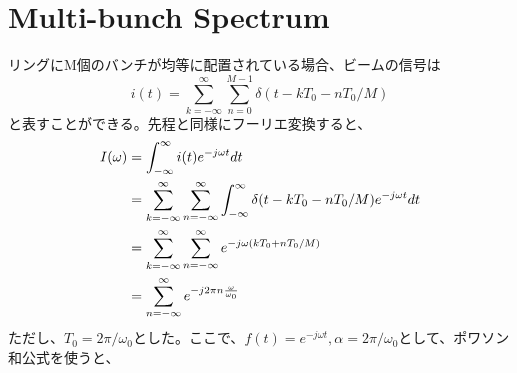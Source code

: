 \documentclass[]{jlreq}
\theoremstyle{definition}
\begin{document}
\section{Multi-bunch Spectrum}
リングにM個のバンチが均等に配置されている場合、ビームの信号は
%
\begin{equation}
  i(t) = \sum_{k=-\infty}^{\infty} \sum_{n=0}^{M-1}\delta (t - k T_0 -n T_0 / M)
\end{equation}
%
と表すことができる。先程と同様にフーリエ変換すると、
%
\begin{align}
  I(\omega) &= \int_{-\infty}^{\infty} i(t) e^{-j \omega t} dt\notag\\
    & = \sum_{k=-\infty}^{\infty} \sum_{n=-\infty}^{\infty} \int_{-\infty}^{\infty} \delta (t - k T_0 - n T_0/M) e^{-j \omega t} dt \notag \\ 
    &= \sum_{k=-\infty}^{\infty} \sum_{n=-\infty}^{\infty} e^{-j\omega (k T_0 + n T_0 / M)} \\
    &= \sum_{n=-\infty}^{\infty} e^{-j 2\pi n \frac{\omega}{\omega_0}}
\end{align}
%
ただし、$T_0 = 2\pi / \omega_0$とした。ここで、$f(t) = e^{-j\omega t}, \alpha = 2\pi /\omega_0$として、ポワソン和公式を使うと、
%
\end{document}
